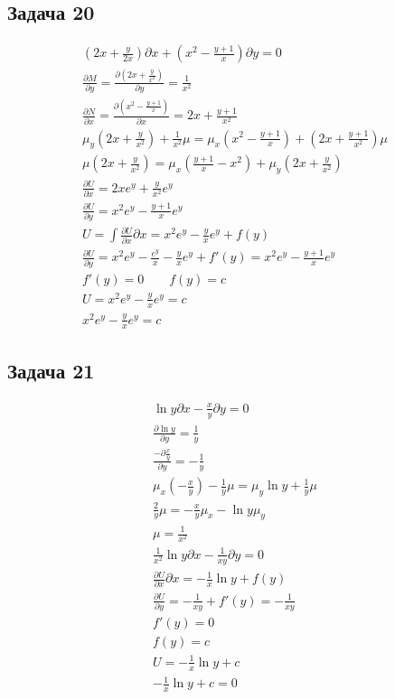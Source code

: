 \subsection*{Задача 20}
\begin{gather*}
	(2x + \frac{y}{2x}) \partial x + (x^2 - \frac{y+1}{x}) \partial y = 0\\
	\frac{\partial M}{\partial y} = \frac{\partial (2x + \frac{y}{x^2})}{\partial y} = \frac{1}{x^2}\\
	\frac{\partial N}{\partial x} = \frac{\partial (x^2 - \frac{y+1}{x})}{\partial x} = 2x + \frac{y+1}{x^2}\\
	\mu_y (2x + \frac{y}{x^2}) + \frac{1}{x^2} \mu = \mu_x (x^2 - \frac{y+1}{x}) + (2x + \frac{y+1}{x^2})\mu\\
	\mu(2x + \frac{y}{x^2}) = \mu_x (\frac{y+1}{x} - x^2) + \mu_y (2x + \frac{y}{x^2})\\
	\frac{\partial U}{\partial x} = 2xe^y + \frac{y}{x^2}e^{y}\\
	\frac{\partial U}{\partial y} = x^2e^{y} - \frac{y+1}{x} e^{y}\\
	U = \int \frac{\partial U}{\partial x} \partial x = x^2 e^y - \frac{y}{x}e^y + f(y)\\
	\frac{\partial U}{\partial y} = x^2e^y - \frac{e^y}{x} - \frac{y}{x}e^{y} + f'(y) = x^2e^{y} - \frac{y+1}{x} e^y\\
	f'(y) = 0\qquad f(y) = c\\
	U = x^2e^{y} - \frac{y}{x} e^{y} = c\\
	x^2e^{y} - \frac{y}{x} e^{y} = c
\end{gather*}


\subsection*{Задача 21}
\begin{gather*}
	\ln y \partial x - \frac{x}{y} \partial y = 0\\
	\frac{\partial \ln y}{\partial y} = \frac{1}{y}\\
	\frac{-\partial \frac{x}{y}}{\partial y} = -\frac{1}{y}\\
	\mu_x (-\frac{x}{y}) - \frac{1}{y} \mu = \mu_y \ln y + \frac{1}{y}\mu\\
	\frac{2}{y} \mu = -\frac{x}{y} \mu_x - \ln y \mu_y\\
	\mu = \frac{1}{x^2}\\
	\frac{1}{x^2} \ln y \partial x - \frac{1}{xy} \partial y = 0\\
	\frac{\partial U}{\partial x} \partial x = -\frac{1}{x} \ln y + f(y)\\
	\frac{\partial U}{\partial y} = -\frac{1}{xy} + f'(y) = -\frac{1}{xy}\\
	f'(y) = 0\\
	f(y) = c\\
	U = -\frac{1}{x} \ln y + c\\
	-\frac{1}{x} \ln y + c = 0
\end{gather*}
